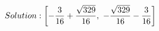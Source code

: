 \documentclass[preview]{standalone}
\begin{document}
\begin{align*}
\special{dvisvgm:raw <g id='unique000'>}Solution: \left[ - \frac{3}{16} + \frac{\sqrt{329}}{16}, \  - \frac{\sqrt{329}}{16} - \frac{3}{16}\right]\special{dvisvgm:raw </g>}
\end{align*}
\end{document}
